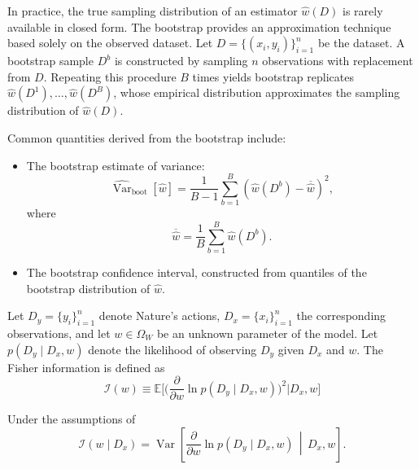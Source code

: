 \begin{example}
	In practice, the true sampling distribution of an estimator $\hat{w}(D)$ is rarely available in closed form. The bootstrap provides an approximation technique based solely on the observed dataset. Let $D = \{(x_i,y_i)\}_{i=1}^n$ be the dataset. A bootstrap sample $D^{b}$ is constructed by sampling $n$ observations with replacement from $D$. Repeating this procedure $B$ times yields bootstrap replicates $\hat{w}(D^{1}), \ldots, \hat{w}(D^{B})$, whose empirical distribution approximates the sampling distribution of $\hat{w}(D)$. 
	
	Common quantities derived from the bootstrap include:
	\begin{itemize}
		\item The bootstrap estimate of variance:
		\begin{equation}
			\widehat{\operatorname{Var}}_{\mathrm{boot}}[\hat{w}] = \frac{1}{B-1}\sum_{b=1}^B \left(\hat{w}(D^{b}) - \overline{\hat{w}}\right)^2,
		\end{equation}
		where
		\begin{equation}
			\overline{\hat{w}} = \frac{1}{B}\sum_{b=1}^B \hat{w}(D^{b}).
		\end{equation}
		\item The bootstrap confidence interval, constructed from quantiles of the bootstrap distribution of $\hat{w}$.
	\end{itemize}
\end{example}

\begin{definition}\label{def:fisher_information}
	Let $D_y = \{y_i\}_{i=1}^n$ denote Nature’s actions, $D_x = \{x_i\}_{i=1}^n$ the corresponding observations, and let $w \in \Omega_W$ be an unknown parameter of the model.  
	Let $p(D_y \mid D_x, w)$ denote the likelihood of observing $D_y$ given $D_x$ and $w$.  
	The Fisher information is defined as
	\begin{equation}
			\mathcal{I}(w)
			\equiv \mathbb{E}\bigg[\bigg(\frac{\partial}{\partial w} \ln p(D_y \mid D_x, w)\bigg)^2 \Bigg|  D_x, w\bigg] 
	\end{equation}
\end{definition}


\begin{theorem}\label{theorem:fisher_information_variance}
	Under the assumptions of 
	\begin{equation}
		\mathcal{I}(w \mid D_x)
		=
		\operatorname{Var}\left[
		\frac{\partial}{\partial w}
		\ln p(D_y \mid D_x,w)
		\,\middle|\,D_x,w
		\right].
	\end{equation}
\end{theorem}


